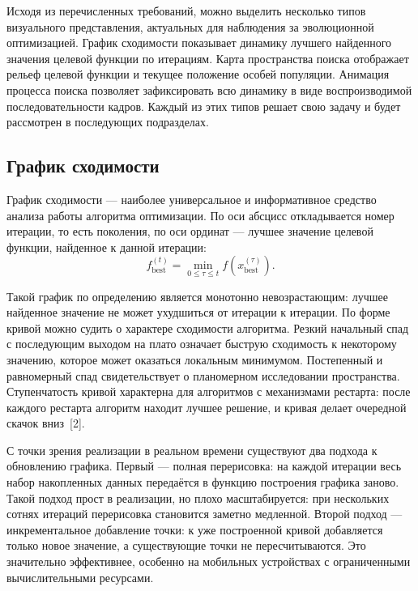 \documentclass[14pt, russian]{scrartcl}
\begin{document}
Исходя из перечисленных требований, можно выделить несколько типов
визуального представления, актуальных для наблюдения за эволюционной
оптимизацией. График сходимости показывает динамику лучшего найденного
значения целевой функции по итерациям. Карта пространства поиска
отображает рельеф целевой функции и текущее положение особей
популяции. Анимация процесса поиска позволяет зафиксировать всю
динамику в виде воспроизводимой последовательности кадров. Каждый из
этих типов решает свою задачу и будет рассмотрен в последующих
подразделах.

\subsection{График сходимости}

График сходимости --- наиболее универсальное и информативное средство
анализа работы алгоритма оптимизации. По оси абсцисс откладывается
номер итерации, то есть поколения, по оси ординат --- лучшее значение
целевой функции, найденное к данной итерации:
\begin{equation}
    f_{\text{best}}^{(t)} = \min_{0 \leq \tau \leq t} f\!\left(x_{\text{best}}^{(\tau)}\right).
\end{equation}

Такой график по определению является монотонно невозрастающим: лучшее
найденное значение не может ухудшиться от итерации к итерации. По форме
кривой можно судить о характере сходимости алгоритма. Резкий начальный
спад с последующим выходом на плато означает быструю сходимость к
некоторому значению, которое может оказаться локальным минимумом.
Постепенный и равномерный спад свидетельствует о планомерном исследовании
пространства. Ступенчатость кривой характерна для алгоритмов с
механизмами рестарта: после каждого рестарта алгоритм находит лучшее
решение, и кривая делает очередной скачок вниз~[2].

С точки зрения реализации в реальном времени существуют два подхода
к обновлению графика. Первый --- полная перерисовка: на каждой итерации
весь набор накопленных данных передаётся в функцию построения графика
заново. Такой подход прост в реализации, но плохо масштабируется: при
нескольких сотнях итераций перерисовка становится заметно медленной.
Второй подход --- инкрементальное добавление точки: к уже построенной
кривой добавляется только новое значение, а существующие точки не
пересчитываются. Это значительно эффективнее, особенно на мобильных
устройствах с ограниченными вычислительными ресурсами.
\end{document}
